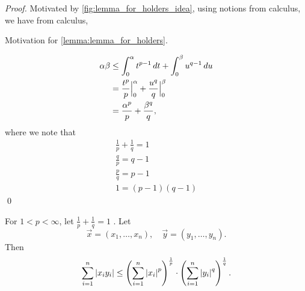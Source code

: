 \documentclass[notoc,notitlepage]{tufte-book}
\begin{document}
\begin{proof}
  Motivated by \cref{fig:lemma_for_holders_idea}, using notions from calculus, we have from calculus,
  \begin{marginfigure}
    \caption{Motivation for \cref{lemma:lemma_for_holders}.}
    \label{fig:lemma_for_holders_idea}
  \end{marginfigure}
  \begin{align*}
    \alpha \beta &\leq \int_{0}^{\alpha} t^{p - 1} \mathop{}\!d{t} + \int_{0}^{\beta} u^{q - 1} \mathop{}\!d{u} \\
                 &= \frac{t^p}{p} \Big|_{0}^{\alpha} + \frac{u^q}{q} \Big|_{0}^{\beta} \\
                 &= \frac{\alpha^p}{p} + \frac{\beta^q}{q},
  \end{align*}
  where we note that
  \begin{gather*}
    \frac{1}{p} + \frac{1}{q} = 1 \\
    \frac{q}{p} = q - 1 \\
    \frac{p}{q} = p - 1 \\
    1 = (p - 1)(q - 1)
  \end{gather*}\qed
\end{proof}

\begin{thm}\label{thm:holder_s_inequality}
  For $1 < p < \infty$, let $\frac{1}{p} + \frac{1}{q} = 1$ . Let
  \begin{equation*}
    \vec{x} = ( x_1, \ldots, x_n ), \quad \vec{y} = ( y_1, \ldots, y_n ).
  \end{equation*}
  Then
  \begin{equation*}
    \sum_{i=1}^{n}  \left| x_i y_i \right| \leq \left( \sum_{i=1}^{n} \left|x_i\right|^p \right)^{\frac{1}{p}} \cdot \left( \sum_{i=1}^{n} \left|y_i\right|^q \right)^{\frac{1}{q}}.
  \end{equation*}
\end{thm}
\end{document}
